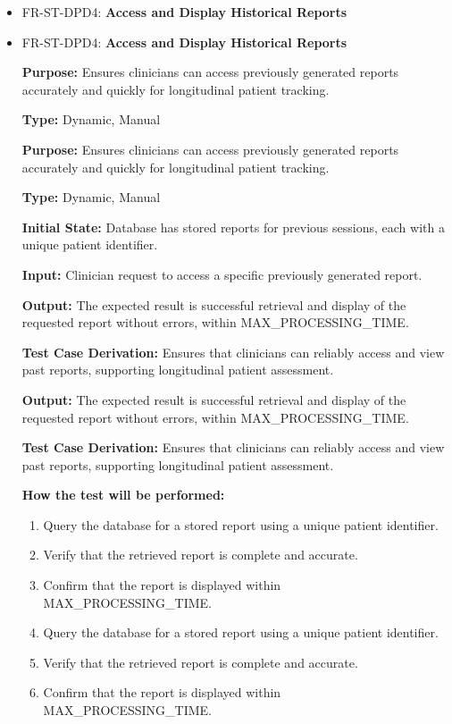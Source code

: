 \documentclass[12pt, titlepage]{article}
\begin{document}
\begin{itemize}
  \item FR-ST-DPD4: \textbf{Access and Display Historical Reports}
  \item FR-ST-DPD4: \textbf{Access and Display Historical Reports}
  \begin{mdframed}[linewidth=0.5mm]
      \textbf{Purpose:} Ensures clinicians can access previously generated reports accurately and quickly for longitudinal patient tracking. \par
      \textbf{Type:} Dynamic, Manual \par
      \textbf{Purpose:} Ensures clinicians can access previously generated reports accurately and quickly for longitudinal patient tracking. \par
      \textbf{Type:} Dynamic, Manual \par
      \textbf{Initial State:} Database has stored reports for previous sessions, each with a unique patient identifier. \par
      \textbf{Input:} Clinician request to access a specific previously generated report. \par
      \textbf{Output:} The expected result is successful retrieval and display of the requested report without errors, within MAX\_PROCESSING\_TIME. \par
      \textbf{Test Case Derivation:} Ensures that clinicians can reliably access and view past reports, supporting longitudinal patient assessment. \par
      \textbf{Output:} The expected result is successful retrieval and display of the requested report without errors, within MAX\_PROCESSING\_TIME. \par
      \textbf{Test Case Derivation:} Ensures that clinicians can reliably access and view past reports, supporting longitudinal patient assessment. \par
      \textbf{How the test will be performed:}
      \begin{enumerate}[noitemsep]
        \item Query the database for a stored report using a unique patient identifier.
        \item Verify that the retrieved report is complete and accurate.
        \item Confirm that the report is displayed within MAX\_PROCESSING\_TIME.
        \item Query the database for a stored report using a unique patient identifier.
        \item Verify that the retrieved report is complete and accurate.
        \item Confirm that the report is displayed within MAX\_PROCESSING\_TIME.
      \end{enumerate}
  \end{mdframed}
\end{itemize}
\end{document}
